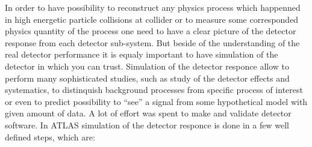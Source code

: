 In order to have possibility to reconstruct any physics process which happenned in high energetic particle collisions at collider or to measure some corresponded physics quantity of the process
one need to have a clear picture of the detector response from each detector sub-system. But beside of the understanding of the real detector performance it is equaly important to have 
simulation of the detector in which you can trust. Simulation of the detector responce allow to perform many sophisticated studies, such as study of the detector effects and systematics,
to distinquish background processes from specific process of interest or even to predict possibility to ``see'' a signal from some hypothetical model with given amount of data.
A lot of effort was spent to make and validate detector software. In ATLAS simulation of the detector responce is done in a few well defined steps, which are:
